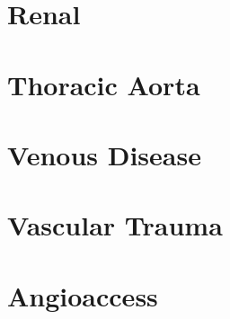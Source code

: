 \documentclass[
]{book}
\begin{document}
\hypertarget{section-2}{%
\section{}\label{section-2}}

\hypertarget{renal}{%
\chapter{Renal}\label{renal}}

\hypertarget{section-3}{%
\section{}\label{section-3}}

\hypertarget{thoracic-aorta}{%
\chapter{Thoracic Aorta}\label{thoracic-aorta}}

\hypertarget{section-4}{%
\section{}\label{section-4}}

\hypertarget{venous-disease}{%
\chapter{Venous Disease}\label{venous-disease}}

\hypertarget{section-5}{%
\section{}\label{section-5}}

\hypertarget{vascular-trauma}{%
\chapter{Vascular Trauma}\label{vascular-trauma}}

\hypertarget{section-6}{%
\section{}\label{section-6}}

\hypertarget{angioaccess}{%
\chapter{Angioaccess}\label{angioaccess}}
\end{document}
